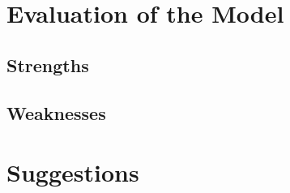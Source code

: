 \documentclass{HZNUMCM}
\begin{document}
  \section{Evaluation of the Model}
    \subsection{Strengths}
    \subsection{Weaknesses}
  \section{Suggestions}


  
\end{document}
